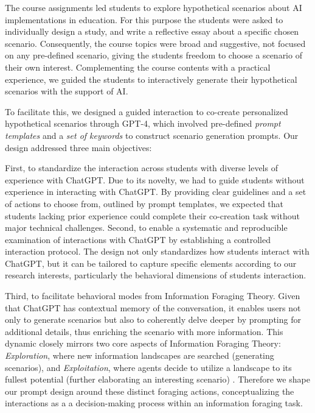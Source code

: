 \documentclass[sn-mathphys, Numbered]{sn-jnl}%
\theoremstyle{thmstyleone}%
\theoremstyle{thmstyletwo}%
\theoremstyle{thmstylethree}%
\begin{document}
The course assignments led students to explore hypothetical scenarios about AI implementations in education. For this purpose the students were asked to individually design a study, and write a reflective essay about a specific chosen scenario. Consequently, the course topics were broad and suggestive, not focused on any pre-defined scenario, giving the students freedom to choose a scenario of their own interest. 
Complementing the course contents with a practical experience, we guided the students to interactively generate their hypothetical scenarios with the support of AI. 


To facilitate this, we designed a guided interaction to co-create personalized hypothetical scenarios through GPT-4, which involved pre-defined \textit{prompt templates} and a \textit{set of keywords} to construct scenario generation prompts. Our design addressed three main objectives:

First, to standardize the interaction across students with diverse levels of experience with ChatGPT. Due to its novelty, we had to guide students without experience in interacting with ChatGPT. By providing clear guidelines and a set of actions to choose from, outlined by prompt templates, we expected that students lacking prior experience could complete their co-creation task without major technical challenges.
Second, to enable a systematic and reproducible examination of interactions with ChatGPT by establishing a controlled interaction protocol. The design not only standardizes how students interact with ChatGPT, but it can be tailored to capture specific elements according to our research interests, particularly the behavioral dimensions of students interaction.

Third, to facilitate behavioral modes from Information Foraging Theory. Given that ChatGPT has contextual memory of the conversation, it enables users not only to generate scenarios but also to coherently delve deeper by prompting for additional details, thus enriching the scenario with more information. This dynamic closely mirrors two core aspects of Information Foraging Theory: \textit{Exploration}, where new information landscapes are searched (generating scenarios), and \textit{Exploitation}, where agents decide to utilize a landscape to its fullest potential (further elaborating an interesting scenario) \parencite{todd_foraging_2020,hills_exploration_2015,cohen_should_2007}. Therefore we shape our prompt design around these distinct foraging actions, conceptualizing the interactions as a a decision-making process within an information foraging task. 
\end{document}
